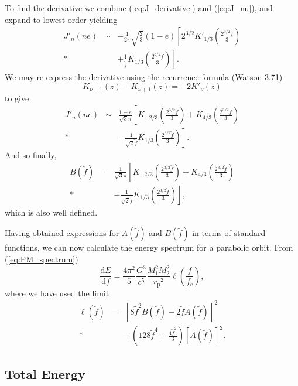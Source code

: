 \documentclass[aps,prd,amsfonts,amssymb,amsmath,reprint,showpacs,groupedaddress]{revtex4-1}
\newcommand{\eqnref}[1]{(\ref{eq:#1})}
\newcommand{\sub}[1]{\ensuremath{_\text{#1}}}
\newcommand{\dd}{\ensuremath{\mathrm{d}}}
\newcommand{\diff}[2]{\ensuremath{\frac{\dd {#1}}{\dd {#2}}}}
\newcommand{\recip}[1]{\ensuremath{\frac{1}{#1}}}
\begin{document}
To find the derivative we combine \eqnref{J_derivative} and \eqnref{J_nu}, and expand to lowest order yielding
\begin{eqnarray}
J'_n(ne) & \sim & -\frac{1}{2\pi}\sqrt{\frac{2}{3}}(1-e)\left[2^{3/2}K'_{1/3}\left(\frac{2^{3/2}\tilde{f}}{3}\right) \right. \nonumber \\*
 & & \left. + \recip{\tilde{f}}K_{1/3}\left(\frac{2^{3/2}\tilde{f}}{3}\right)\right].
\end{eqnarray}
We may re-express the derivative using the recurrence formula (Watson\cite{Watson1995} 3.71)
\begin{equation}
K_{\nu-1}(z) - K_{\nu+1}(z) = -2K'_\nu(z)
\end{equation}
to give
\begin{eqnarray}
J'_n(ne) & \sim & \frac{1-e}{\sqrt{3}\pi}\left[K_{-2/3}\left(\frac{2^{3/2}\tilde{f}}{3}\right) + K_{4/3}\left(\frac{2^{3/2}\tilde{f}}{3}\right) \right. \nonumber \\*
 & & \left. - \recip{\sqrt{2}\tilde{f}}K_{1/3}\left(\frac{2^{3/2}\tilde{f}}{3}\right)\right].
\end{eqnarray}
And so finally,
\begin{eqnarray}
B(\tilde{f}) & = & \recip{\sqrt{3}\pi}\left[K_{-2/3}\left(\frac{2^{3/2}\tilde{f}}{3}\right) + K_{4/3}\left(\frac{2^{3/2}\tilde{f}}{3}\right) \right. \nonumber \\*
 & & \left. - \recip{\sqrt{2}\tilde{f}}K_{1/3}\left(\frac{2^{3/2}\tilde{f}}{3}\right)\right],
\end{eqnarray}
which is also well defined.

Having obtained expressions for $A(\tilde{f})$ and $B(\tilde{f})$ in terms of standard functions, we can now calculate the energy spectrum for a parabolic orbit. From \eqnref{PM_spectrum}
\begin{equation}
\diff{E}{f} = \frac{4\pi^2}{5}\frac{G^3}{c^5}\frac{M_1^2M_2^2}{r\sub{p}^2}\ell\left(\frac{f}{f\sub{c}}\right),
\label{eq:PM_dEdf}
\end{equation}
where we have used the limit
\begin{eqnarray}
\ell(\tilde{f}) & = & \left[8\tilde{f}^2B(\tilde{f}) - 2\tilde{f}A(\tilde{f})\right]^2 \nonumber \\*
 & & + \left(128\tilde{f}^4 + \frac{4\tilde{f}^2}{3}\right)\left[A(\tilde{f})\right]^2.
\end{eqnarray}

\subsection{Total Energy}
\end{document}

